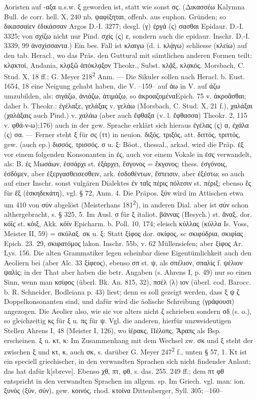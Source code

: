 Aoristen auf -αξα u.s.w. ξ geworden ist, statt wie sonst σς. (Δικασσέω Kalymna Bull. de corr. hell. Χ, 240 nb. ψαφίξηται, offenb. aus euphon. Gründen; so δικασσαίεν ἐδικάσσαν Argos D.-I. 3277; desgl. (γ) ἐργά (ς) σασθαι Epidaur. D.-I. 3325; von σχίζω nicht nur Pind. σχίς (ς) ε, sondern auch die epidaur. Inschr. D.-I. 3339, 99 ἀνσχίσσαντα.) Ein bes. Fall ist κλαιγω (d. i. κλᾴγω) schliesse (κλείω) auf den tab. Heracl., wo das Präs. den Guttural mit sämtlichen anderen Formen teilt: κλᾳκτοί, Andania, κλᾳξῶ ἀπόκλᾳξον Theokr., Subst. κλᾷξ, κλᾳκός. Morsbach, C. Stud. Χ, 18 ff.; G. Meyer 218\textsuperscript{2} Anm. — Die Sikuler sollen nach Heracl. b. Eust. 1654, 18 eine Neigung gehabt haben, die V. --159-- auf άω in V. auf άζω umzubilden, als: σιγάζω, ἀνιάζω, ἀτιμάζω, so ἀκροαζομέναEpich. 75 v. ἀκροᾶσθαι; daher b. Theokr.: ἐγέλαξε, γελάξας v. γελάω (Morsbach, C. Stud. Χ, 21 f.), χαλάξαι (χαλάξαις auch Pind.) v. χαλάω (aber auch ἔφθαξα (v. l. ἔφθασσα) Theokr. 2, 115 v. φθά-ν-ω);176) auch in der gew. Sprache erklärt sich hieraus ἐγέλας (ς) α, ἐχάλα (ς) σα. — Ferner steht ξ für σς (ττ) in neuion. διξός, τριξός, att. διττός, τριττός, gew. (auch ep.) δισσός, τρισσός. σ u. ξ: Böot., thessal., arkad. wird die Präp. ἐξ vor einem folgenden Konsonanten in ἐς,  auch vor einem Vokale in ἐσς verwandelt, als: B. ἐς Μωσάων, ἐσσάρχι st. ἐξάρχει, ἔσγονος = ἔκγονος; thess. ἐσγόνοις, ἐσδόμεν, aber ἐξεργασθεισεσθειν, ark. ἐσδοθέντων, ἔστεισιν, aber ἐξέστω; so auch auf einer  Inschr. sonst vulgären Dialektes ἐν ταῖς πέρις πόλεσιν st. πέριξ; ebenso ἕς für ἕξ (ἑσκηδεκάτη), vgl. § 72, Anm. 4. Die Präpos. ξύν wird im Attischen etwa um 410 von σύν abgelöst (Meisterhans 181\textsuperscript{2}), in anderen Dial. aber ist σύν schon althergebracht, s. § 325, 5. Im Ausl. σ für ξ italiot. βάννας (Hesych.) st. ἄναξ, dor. κόϊς st. κόιξ, Akk. κόϊν Epicharm. b. Poll. 10, 174; eleisch κύλλας (κύλλα Is. Voss, Meister II, 59) = σκύλαξ. σκ u. ξ: Statt ξίφος dor. σκίφος, sc σκιφύδρια, σκιφίας Epich. 23. 29, σκιφατόμος lakon. Inschr. 55b, v. 62 Müllensiefen; aber ξίφος Ar. Lys. 156. Die alten Grammatiker legen scheinbar diese Eigentümlichkeit auch den Aeoliern bei (aber Alc. 33 ξίφεος), ebenso σπ st. ψ, als σπέλιον, σπαλίς f. ψέλιον ψαλίς; in der That aber haben die betr. Angaben (s. Ahrens I, p. 49) nur so einen Sinn, wenn man κσίφος (überl. Bk. An. 815, 32), πσέλ (λ) ιον (überl. cod. Barocc. b. R. Schneider, Bodleiana p. 43) liest; denn es soll gezeigt werden, dass ξ ψ ζ Doppelkonsonanten sind, und dafür wird die äolische Schreibung (γράφουσι) angezogen. Die Aeolier also, wie sie vor alters nicht ζ schrieben sondern σδ (s. o.), so gleichzeitig κς für ξ u. πς für ψ. Vgl. die anderen, hierfür unzweideutigen Stellen Ahrens I, 48 (Meister I, 126), wo ἱέρακς, Πέλοπς, Ἄραπς als Bsp. erscheinen. ξ u. κτ, κ: Im Zusammenhang mit dem Wechsel zw. σκ und ξ steht der zwischen ξ und κτ, κ, auch σκ, s. darüber G. Meyer 247\textsuperscript{2} f., unten § 57, 1. Κτ ist ein speciell griechischer, in den verwandten Sprachen sich nicht findender Anlaut; das  hat dafür k[sbreve]. Ebenso χθ, πτ, φθ, s. das. 255. 249 ff.; dem πτ φθ entspricht in den verwandten Sprachen im allgem. sp. Im Griech. vgl. man: ion. ξυνός (ξύν, σύν), gew. κοινός, rhod. κτοίνα Dittenberger, Syll. 305; --160-- 